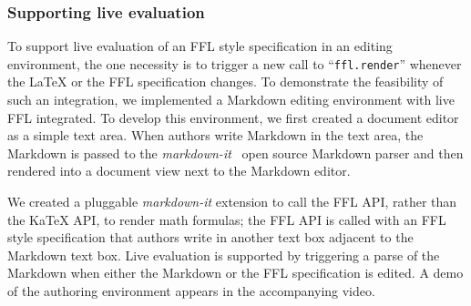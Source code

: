 

\subsubsection{Supporting live evaluation}\label{sec:live_evaluation}
To support live evaluation of an FFL style specification in an editing environment, the one necessity is to trigger a new call to ``\texttt{ffl.render}'' whenever the LaTeX or the FFL specification changes.
To demonstrate the feasibility of such an integration, we implemented a Markdown editing environment with live FFL integrated. To develop this environment, we first created a document editor as a simple text area. When authors write Markdown in the text area, the Markdown is passed to the \textit{markdown-it}~\cite{MarkdownIt} open source Markdown parser and then rendered into a document view next to the Markdown editor.

We created a pluggable \textit{markdown-it} extension to call the FFL API, rather than the KaTeX API, to render math formulas; the FFL API is called with an FFL style specification that authors write in another text box adjacent to the Markdown text box. Live evaluation is supported by triggering a parse of the Markdown when either the Markdown or the FFL specification is edited.  A demo of the authoring environment appears in the accompanying video. %


